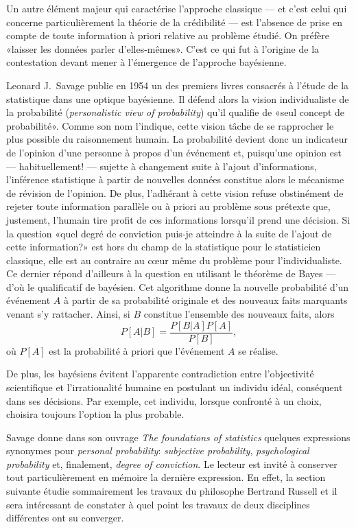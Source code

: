 Un autre élément majeur qui caractérise l'approche classique --- et
c'est celui qui concerne particulièrement la théorie de la crédibilité
--- est l'absence de prise en compte de toute information à priori
relative au problème étudié. On préfère «laisser les données parler
d'elles-mêmes». C'est ce qui fut à l'origine de la contestation devant
mener à l'émergence de l'approche bayésienne.

Leonard J.\ Savage publie en 1954 \citep{Savage:foundations:1954} un des premiers
livres consacrés à l'étude de la statistique dans une optique
bayésienne. Il défend alors la vision individualiste de la probabilité
(\emph{personalistic view of probability}) qu'il qualifie de «seul
concept de probabilité». Comme son nom l'indique, cette vision tâche
de se rapprocher le plus possible du raisonnement humain.  La
probabilité devient donc un indicateur de l'opinion d'une personne à
propos d'un événement et, puisqu'une opinion est --- habituellement!
--- sujette à changement suite à l'ajout d'informations, l'inférence
statistique à partir de nouvelles données constitue alors le mécanisme
de révision de l'opinion. De plus, l'adhérant à cette vision refuse
obstinément de rejeter toute information parallèle ou à priori au
problème sous prétexte que, justement, l'humain tire profit de ces
informations lorsqu'il prend une décision. Si la question «quel degré
de conviction puis-je atteindre à la suite de l'ajout de cette information?»
est hors du champ de la statistique pour le statisticien classique,
elle est au contraire au c{\oe}ur même du problème pour
l'individualiste.  Ce dernier répond d'ailleurs à la question en
utilisant le théorème de Bayes --- d'où le qualificatif de bayésien.
Cet algorithme donne la nouvelle probabilité d'un événement $A$ à
partir de sa probabilité originale et des nouveaux faits marquants
venant s'y rattacher. Ainsi, si $B$ constitue l'ensemble des nouveaux
faits, alors
\begin{equation*}
  P[A|B]= \frac{P[B|A]P[A]}{P[B]},
\end{equation*}
où $P[A]$ est la probabilité à priori que l'événement $A$ se réalise.

De plus, les bayésiens évitent l'apparente contradiction entre
l'objectivité scientifique et l'irrationalité humaine en postulant un
individu idéal, conséquent dans ses décisions. Par exemple, cet
individu, lorsque confronté à un choix, choisira toujours l'option la
plus probable.

Savage donne dans son ouvrage \emph{The foundations of statistics}
quelques expressions synonymes pour \emph{personal probability}:
\emph{subjective probability}, \emph{psychological probability} et,
finalement, \emph{degree of conviction}. Le lecteur est invité à
conserver tout particulièrement en mémoire la dernière expression. En
effet, la section suivante étudie sommairement les travaux du
philosophe Bertrand Russell et il sera intéressant de constater à quel
point les travaux de deux disciplines différentes ont su converger.

